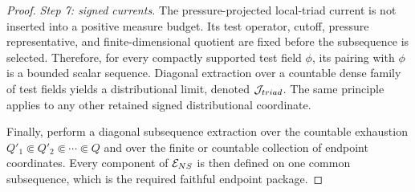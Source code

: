 \documentclass[10pt,a4paper]{amsart}
\begin{document}
\begin{proof}
\emph{Step 7: signed currents.}
The pressure-projected local-triad current is not inserted into a positive
measure budget.  Its test operator, cutoff, pressure representative, and
finite-dimensional quotient are fixed before the subsequence is selected.
Therefore, for every compactly supported test field \(\phi\), its pairing with
\(\phi\) is a bounded scalar sequence.  Diagonal extraction over a countable
dense family of test fields yields a distributional limit, denoted
\(\mathcal J_{\rm triad}\).  The same principle applies to any other retained
signed distributional coordinate.

Finally, perform a diagonal subsequence extraction over the countable
exhaustion \(Q'_1\Subset Q'_2\Subset\cdots\Subset Q\) and over the finite or
countable collection of endpoint coordinates.  Every component of
\(\mathcal E_{\rm NS}\) is then defined on one common subsequence, which is the
required faithful endpoint package.
\end{proof}
\end{document}
